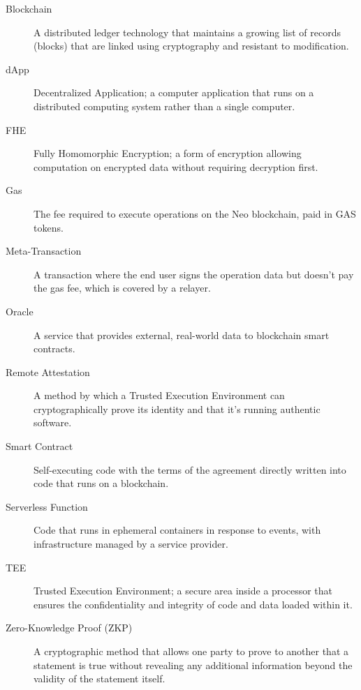 \documentclass[11pt]{article}
\begin{document}
\begin{description}
    \item[Blockchain] A distributed ledger technology that maintains a growing list of records (blocks) that are linked using cryptography and resistant to modification.
    
    \item[dApp] Decentralized Application; a computer application that runs on a distributed computing system rather than a single computer.
    
    \item[FHE] Fully Homomorphic Encryption; a form of encryption allowing computation on encrypted data without requiring decryption first.
    
    \item[Gas] The fee required to execute operations on the Neo blockchain, paid in GAS tokens.
    
    \item[Meta-Transaction] A transaction where the end user signs the operation data but doesn't pay the gas fee, which is covered by a relayer.
    
    \item[Oracle] A service that provides external, real-world data to blockchain smart contracts.
    
    \item[Remote Attestation] A method by which a Trusted Execution Environment can cryptographically prove its identity and that it's running authentic software.
    
    \item[Smart Contract] Self-executing code with the terms of the agreement directly written into code that runs on a blockchain.
    
    \item[Serverless Function] Code that runs in ephemeral containers in response to events, with infrastructure managed by a service provider.
    
    \item[TEE] Trusted Execution Environment; a secure area inside a processor that ensures the confidentiality and integrity of code and data loaded within it.
    
    \item[Zero-Knowledge Proof (ZKP)] A cryptographic method that allows one party to prove to another that a statement is true without revealing any additional information beyond the validity of the statement itself.
    

\end{description}
\end{document}
